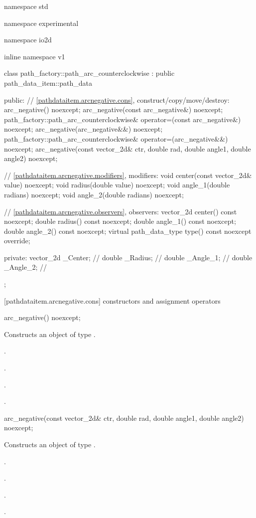 \begin{codeblock}
namespace std { namespace experimental { namespace io2d { inline namespace v1 {
  class path_factory::path_arc_counterclockwise : public path_data_item::path_data {
  public:
    // \ref{pathdataitem.arcnegative.cons}, construct/copy/move/destroy:
    arc_negative() noexcept;
    arc_negative(const arc_negative&) noexcept;
    path_factory::path_arc_counterclockwise& operator=(const arc_negative&) noexcept;
    arc_negative(arc_negative&&) noexcept;
    path_factory::path_arc_counterclockwise& operator=(arc_negative&&) noexcept;
    arc_negative(const vector_2d& ctr, double rad, double angle1,
      double angle2) noexcept;

    // \ref{pathdataitem.arcnegative.modifiers}, modifiers:
    void center(const vector_2d& value) noexcept;
    void radius(double value) noexcept;
    void angle_1(double radians) noexcept;
    void angle_2(double radians) noexcept;

    // \ref{pathdataitem.arcnegative.observers}, observers:
    vector_2d center() const noexcept;
    double radius() const noexcept;
    double angle_1() const noexcept;
    double angle_2() const noexcept;
    virtual path_data_type type() const noexcept override;

  private:
    vector_2d _Center;   // \expos
    double _Radius;  // \expos
    double _Angle_1; // \expos
    double _Angle_2; // \expos
  };
} } } }
\end{codeblock}

 [pathdataitem.arcnegative.cons] { constructors and assignment operators}

\begin{itemdecl}
    arc_negative() noexcept;
\end{itemdecl}
\begin{itemdescr}
	\pnum
	\effects
	Constructs an object of type .
	
	\pnum
	\postconditions
	.

	.

	.

	.
\end{itemdescr}

\begin{itemdecl}
    arc_negative(const vector_2d& ctr, double rad, double angle1,
      double angle2) noexcept;
\end{itemdecl}
\begin{itemdescr}
	\pnum
	\effects
	Constructs an object of type .
	
	\pnum
	\postconditions
	.

	.

	.

	.
\end{itemdescr}

